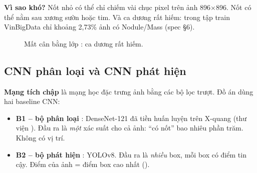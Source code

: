 \textbf{Vì sao khó?} Nốt nhỏ có thể chỉ chiếm vài chục pixel trên ảnh 896$\times$896. Nốt có thể nằm sau xương sườn hoặc tim.
Và ca dương rất hiếm: trong tập train VinBigData chỉ khoảng 2,73\% ảnh có Nodule/Mass (spec §6).

\begin{figure}[H]
\centering
{}
\caption{Mất cân bằng lớp : ca dương rất hiếm.}
\label{fig:imbalance}
\end{figure}

\subsection{CNN phân loại và CNN phát hiện}
\label{sec:cnn}

\textbf{Mạng tích chập}  là mạng học đặc trưng ảnh bằng các bộ lọc trượt.
Đồ án dùng hai baseline CNN:

\begin{itemize}
\item \textbf{B1 -- bộ phân loại} : DenseNet-121 đã tiền huấn luyện trên X-quang (thư viện ).
      Đầu ra là \emph{một} xác suất cho cả ảnh: ``có nốt'' bao nhiêu phần trăm. Không có vị trí.
\item \textbf{B2 -- bộ phát hiện} : YOLOv8. Đầu ra là \emph{nhiều} box, mỗi box có điểm tin cậy.
      Điểm của ảnh = điểm box cao nhất ().
\end{itemize}

